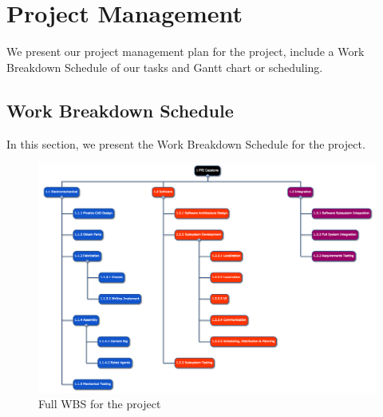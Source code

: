 
\section{Project Management}
\label{sec:project_management}
We present our project management plan for the project, include a Work Breakdown Schedule of our tasks and Gantt chart or scheduling. 

\subsection{Work Breakdown Schedule}
\label{sec:wbs}

In this section, we present the Work Breakdown Schedule for the project.

\begin{figure}[h!]
\centering
\includegraphics[width=0.98\columnwidth]{wbs_schedule/wbs_1_31_17.png}
\caption{Full WBS for the project}
\label{fig:full-wbs}
\end{figure}
